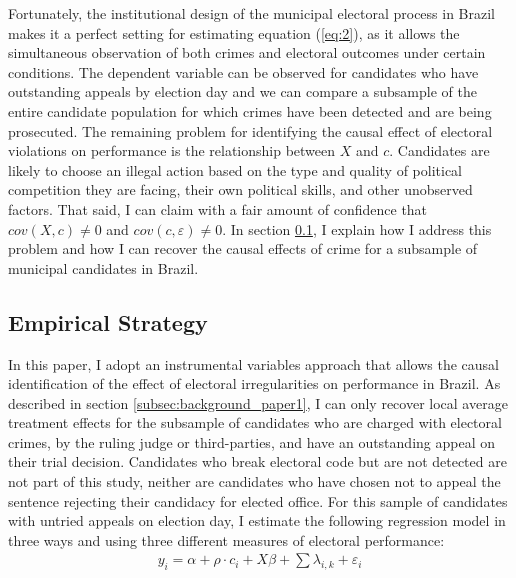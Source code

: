 \documentclass[11pt]{article}
\newcommand{\refp}[1]{(\ref{#1})}
\begin{document}
Fortunately, the institutional design of the municipal electoral process in Brazil makes it a perfect setting for estimating equation \refp{eq:2}, as it allows the simultaneous observation of both crimes and electoral outcomes under certain conditions. The dependent variable can be observed for candidates who have outstanding appeals by election day and we can compare a subsample of the entire candidate population for which crimes have been detected and are being prosecuted. The remaining problem for identifying the causal effect of electoral violations on performance is the relationship between $X$ and $c$. Candidates are likely to choose an illegal action based on the type and quality of political competition they are facing, their own political skills, and other unobserved factors. That said, I can claim with a fair amount of confidence that $cov(X,c) \neq 0$ and $cov(c, \varepsilon) \neq 0$. In section \ref{subsec:methods_paper1}, I explain how I address this problem and how I can recover the causal effects of crime for a subsample of municipal candidates in Brazil.

\subsection{Empirical Strategy} \label{subsec:methods_paper1}

In this paper, I adopt an instrumental variables approach that allows the causal identification of the effect of electoral irregularities on performance in Brazil. As described in section \ref{subsec:background_paper1}, I can only recover local average treatment effects for the subsample of candidates who are charged with electoral crimes, by the ruling judge or third-parties, and have an outstanding appeal on their trial decision. Candidates who break electoral code but are not detected are not part of this study, neither are candidates who have chosen not to appeal the sentence rejecting their candidacy for elected office. For this sample of candidates with untried appeals on election day, I estimate the following regression model in three ways and using three different measures of electoral performance:
\begin{equation} \label{eq:reg1}
  \begin{split}
    y_{i} = \alpha + \rho \cdot c_{i} + X\beta + \sum \lambda_{i, k} + \varepsilon_{i}
  \end{split}
\end{equation}
\end{document}
